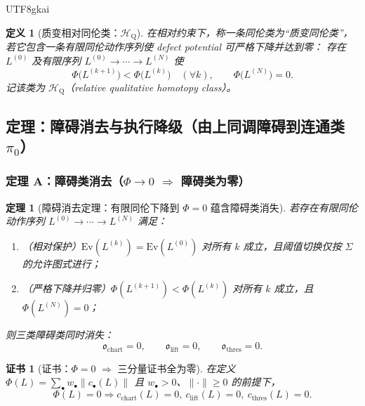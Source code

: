 \documentclass[12pt]{article}
\newtheorem{definition}{定义}[section]
\newtheorem{theorem}{定理}[section]
\newtheorem{certificate}{证书}[section]
\begin{document}
\begin{CJK*}{UTF8}{gkai}
\begin{definition}[质变相对同伦类：$\mathcal{H}_{\mathrm{Q}}$]
\label{def:qualitative-relative-homotopy-class}
在相对约束下，称一条同伦类为“质变同伦类”，若它包含一条有限同伦动作序列使 defect potential 可严格下降并达到零：
存在 $L^{(0)}$ 及有限序列 $L^{(0)}\to\cdots\to L^{(N)}$ 使
\[
\Phi\bigl(L^{(k+1)}\bigr)<\Phi\bigl(L^{(k)}\bigr)\quad(\forall k),\qquad
\Phi\bigl(L^{(N)}\bigr)=0.
\]
记该类为 $\mathcal{H}_{\mathrm{Q}}$（relative qualitative homotopy class）。
\end{definition}

\subsection{定理：障碍消去与执行降级（由上同调障碍到连通类 $\pi_0$）}

\subsubsection{定理 A：障碍类消去（$\Phi\to 0$ $\Rightarrow$ 障碍类为零）}

\begin{theorem}[障碍消去定理：有限同伦下降到 $\Phi=0$ 蕴含障碍类消失]
\label{thm:obstruction-vanishing}
若存在有限同伦动作序列 $L^{(0)}\to\cdots\to L^{(N)}$ 满足：
\begin{enumerate}
  \item（相对保护）$\mathrm{Ev}(L^{(k)})=\mathrm{Ev}(L^{(0)})$ 对所有 $k$ 成立，且阈值切换仅按 $\Sigma$ 的允许图式进行；
  \item（严格下降并归零）$\Phi(L^{(k+1)})<\Phi(L^{(k)})$ 对所有 $k$ 成立，且 $\Phi(L^{(N)})=0$；
\end{enumerate}
则三类障碍类同时消失：
\[
\mathfrak{o}_{\mathrm{chart}}=0,\qquad
\mathfrak{o}_{\mathrm{lift}}=0,\qquad
\mathfrak{o}_{\mathrm{thres}}=0.
\]
\end{theorem}

\begin{certificate}[证书：$\Phi=0$ $\Rightarrow$ 三分量证书全为零]
\label{cert:phi0-implies-components0}
在定义 $\Phi(L)=\sum_{\bullet} w_{\bullet}\|c_{\bullet}(L)\|$ 且 $w_{\bullet}>0$、$\|\cdot\|\ge 0$ 的前提下，
\[
\Phi(L)=0\Rightarrow c_{\mathrm{chart}}(L)=0,\ c_{\mathrm{lift}}(L)=0,\ c_{\mathrm{thres}}(L)=0.
\]
\end{certificate}


\end{CJK*}
\end{document}
